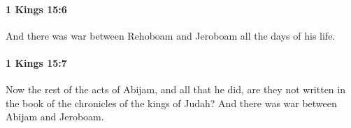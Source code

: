 		\paragraph{1 Kings 15:6} %
			\label{1KINGS-15-6}

			And there was war between Rehoboam and Jeroboam all the days of his life.


		\paragraph{1 Kings 15:7} %
			\label{1KINGS-15-7}

			Now the rest of the acts of Abijam, and all that he did, are they not written in the book of the chronicles of the kings of Judah? And there was war between Abijam and Jeroboam.


